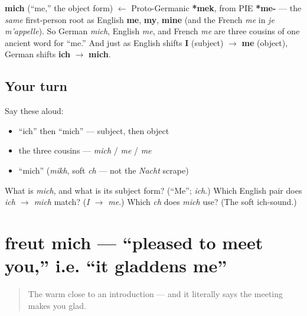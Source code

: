 \begin{cousinweb}
\textbf{mich} (\textquotedblleft{}me,\textquotedblright{} the object form) $\leftarrow$ Proto-Germanic \textbf{*mek}, from PIE \textbf{*me-} — the \emph{same} first-person root as English \textbf{me}, \textbf{my}, \textbf{mine} (and the French \emph{me} in \emph{je m'appelle}). So German \emph{mich}, English \emph{me}, and French \emph{me} are three cousins of one ancient word for \textquotedblleft{}me.\textquotedblright{} And just as English shifts \textbf{I} (subject) $\to$ \textbf{me} (object), German shifts \textbf{ich} $\to$ \textbf{mich}.
\end{cousinweb}

\subsection*{Your turn}
Say these aloud:

\begin{itemize}
\raggedright
  \item \textquotedblleft{}ich\textquotedblright{} then \textquotedblleft{}mich\textquotedblright{} — subject, then object
  \item the three cousins — \emph{mich} / \emph{me} / \emph{me}
  \item \textquotedblleft{}mich\textquotedblright{} (\emph{mikh}, soft \emph{ch} — not the \emph{Nacht} scrape)
\end{itemize}

\begin{tcolorbox}[breakable,colback=teal!4,colframe=teal!35!black,title={Before you move on}]
What is \emph{mich}, and what is its subject form? (\textquotedblleft{}Me\textquotedblright{}; \emph{ich}.) Which English pair does \emph{ich $\to$ mich} match? (\emph{I $\to$ me}.) Which \emph{ch} does \emph{mich} use? (The soft ich-sound.)
\end{tcolorbox}
\section[freut mich]{freut mich — \textquotedblleft{}pleased to meet you,\textquotedblright{} i.e. \textquotedblleft{}it gladdens me\textquotedblright{}}

\label{lesson:GE-C02-freut-mich}



\begin{quote}
The warm close to an introduction — and it literally says the meeting makes you glad.
\end{quote}

